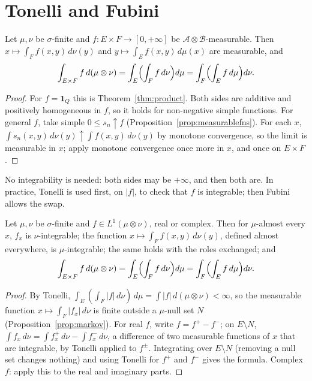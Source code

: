 \section{Tonelli and Fubini}

\begin{theorem}[Tonelli]\label{thm:tonelli}
Let $\mu,\nu$ be $\sigma$-finite and $f:E\times F\to[0,+\infty]$ be $\mathcal A\otimes\mathcal B$-measurable. Then $x\mapsto\int_Ff(x,y)\,d\nu(y)$ and $y\mapsto\int_Ef(x,y)\,d\mu(x)$ are measurable, and
\[\int_{E\times F}f\,d(\mu\otimes\nu)=\int_E\Bigl(\int_Ff\,d\nu\Bigr)d\mu=\int_F\Bigl(\int_Ef\,d\mu\Bigr)d\nu.\]
\end{theorem}
\begin{proof}
For $f=\mathbf 1_Q$ this is Theorem~\ref{thm:product}. Both sides are additive and positively homogeneous in $f$, so it holds for non-negative simple functions. For general $f$, take simple
$0\le s_n\uparrow f$ (Proposition~\ref{prop:measurablefns}). For each $x$, $\int s_n(x,y)\,d\nu(y)\uparrow\int f(x,y)\,d\nu(y)$ by monotone convergence, so the limit is measurable in $x$; apply monotone
convergence once more in $x$, and once on $E\times F$.
\end{proof}

No integrability is needed: both sides may be $+\infty$, and then both are. In practice, Tonelli is used first, on $|f|$, to check that $f$ is integrable;
then Fubini allows the swap.

\begin{theorem}[Fubini]\label{thm:fubini}
Let $\mu,\nu$ be $\sigma$-finite and $f\in L^1(\mu\otimes\nu)$, real or complex. Then for $\mu$-almost every $x$, $f_x$ is $\nu$-integrable; the function $x\mapsto\int_Ff(x,y)\,d\nu(y)$, defined almost
everywhere, is $\mu$-integrable; the same holds with the roles exchanged; and
\[\int_{E\times F}f\,d(\mu\otimes\nu)=\int_E\Bigl(\int_Ff\,d\nu\Bigr)d\mu=\int_F\Bigl(\int_Ef\,d\mu\Bigr)d\nu.\]
\end{theorem}
\begin{proof}
By Tonelli, $\int_E(\int_F|f|\,d\nu)\,d\mu=\int|f|\,d(\mu\otimes\nu)<\infty$, so the measurable function $x\mapsto\int_F|f_x|\,d\nu$ is finite outside a $\mu$-null set $N$ (Proposition~\ref{prop:markov}). For real
$f$, write $f=f^+-f^-$; on $E\setminus N$, $\int f_x\,d\nu=\int f^+_x\,d\nu-\int f^-_x\,d\nu$, a difference of two measurable functions of $x$ that are integrable, by Tonelli applied to $f^\pm$. Integrating over
$E\setminus N$ (removing a null set changes nothing) and using Tonelli for $f^+$ and $f^-$ gives the formula. Complex $f$: apply this to the real and imaginary parts.
\end{proof}

